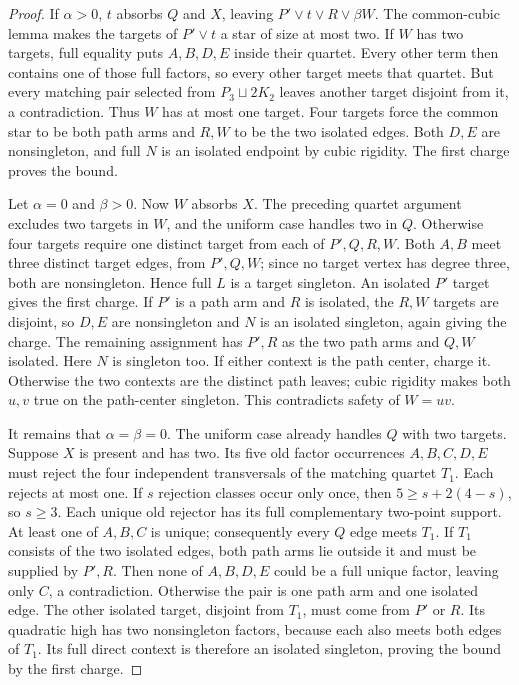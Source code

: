 \documentclass[11pt]{article}
\theoremstyle{definition}
\theoremstyle{remark}
\begin{document}
\begin{proof}
If $\alpha>0$, $t$ absorbs $Q$ and $X$, leaving $P'\vee t\vee R\vee\beta W$. The common-cubic lemma makes the targets of $P'\vee t$ a star of size at most two. If $W$ has two targets, full equality puts $A,B,D,E$ inside their quartet. Every other term then contains one of those full factors, so every other target meets that quartet. But every matching pair selected from $P_3\sqcup2K_2$ leaves another target disjoint from it, a contradiction. Thus $W$ has at most one target. Four targets force the common star to be both path arms and $R,W$ to be the two isolated edges. Both $D,E$ are nonsingleton, and full $N$ is an isolated endpoint by cubic rigidity. The first charge proves the bound.

Let $\alpha=0$ and $\beta>0$. Now $W$ absorbs $X$. The preceding quartet argument excludes two targets in $W$, and the uniform case handles two in $Q$. Otherwise four targets require one distinct target from each of $P',Q,R,W$. Both $A,B$ meet three distinct target edges, from $P',Q,W$; since no target vertex has degree three, both are nonsingleton. Hence full $L$ is a target singleton. An isolated $P'$ target gives the first charge. If $P'$ is a path arm and $R$ is isolated, the $R,W$ targets are disjoint, so $D,E$ are nonsingleton and $N$ is an isolated singleton, again giving the charge. The remaining assignment has $P',R$ as the two path arms and $Q,W$ isolated. Here $N$ is singleton too. If either context is the path center, charge it. Otherwise the two contexts are the distinct path leaves; cubic rigidity makes both $u,v$ true on the path-center singleton. This contradicts safety of $W=uv$.

It remains that $\alpha=\beta=0$. The uniform case already handles $Q$ with two targets. Suppose $X$ is present and has two. Its five old factor occurrences $A,B,C,D,E$ must reject the four independent transversals of the matching quartet $T_1$. Each rejects at most one. If $s$ rejection classes occur only once, then $5\ge s+2(4-s)$, so $s\ge3$. Each unique old rejector has its full complementary two-point support. At least one of $A,B,C$ is unique; consequently every $Q$ edge meets $T_1$. If $T_1$ consists of the two isolated edges, both path arms lie outside it and must be supplied by $P',R$. Then none of $A,B,D,E$ could be a full unique factor, leaving only $C$, a contradiction. Otherwise the pair is one path arm and one isolated edge. The other isolated target, disjoint from $T_1$, must come from $P'$ or $R$. Its quadratic high has two nonsingleton factors, because each also meets both edges of $T_1$. Its full direct context is therefore an isolated singleton, proving the bound by the first charge.


\end{proof}
\end{document}
